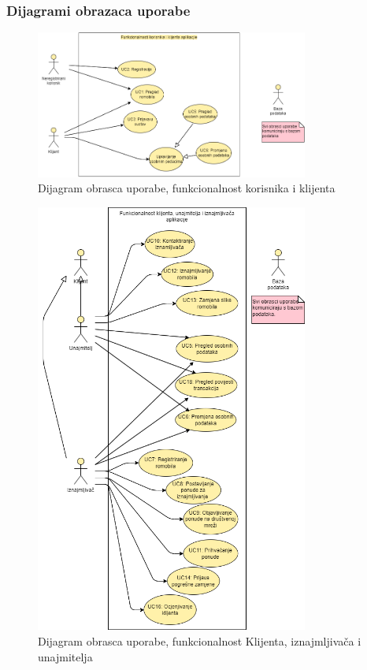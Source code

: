 				\subsubsection{Dijagrami obrazaca uporabe}
				
				
					\begin{figure}[H]
						\centering
						\includegraphics[width=0.8\textwidth]{slike/Funkcionalnost_klijent_korisnik.png}
						\caption{Dijagram obrasca uporabe, funkcionalnost korisnika i klijenta}
						\label{fig:your_label}
					\end{figure}
					
					\begin{figure}[H]
						\centering
						\includegraphics[width=0.8\textwidth]{slike/IznajmljivacUnajmitelj.png}
						\caption{Dijagram obrasca uporabe, funkcionalnost Klijenta, iznajmljivača i unajmitelja}
						\label{fig:your_label}
					\end{figure}
					

